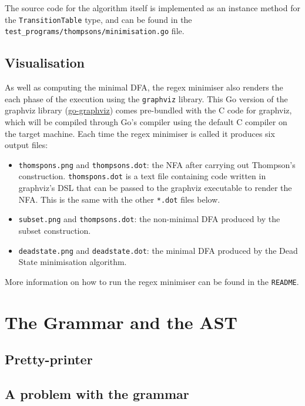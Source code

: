\documentclass[]{full}
\theoremstyle{definition}
\begin{document}
The source code for the algorithm itself is implemented as an instance method for the \verb|TransitionTable| type, and can be found in the \verb|test_programs/thompsons/minimisation.go| file.

\subsection{Visualisation}

As well as computing the minimal DFA, the regex minimiser also renders the each phase of the execution using the \verb|graphviz| library. This Go version of the graphviz library (\href{https://github.com/goccy/go-graphviz}{go-graphviz}) comes pre-bundled with the C code for graphviz, which will be compiled through Go's compiler using the default C compiler on the target machine. Each time the regex minimiser is called it produces six output files:

\begin{itemize}
    \item \verb|thomspons.png| and \verb|thompsons.dot|: the NFA after carrying out Thompson's construction. \verb|thomspons.dot| is a text file containing code written in graphviz's DSL that can be passed to the graphviz executable to render the NFA. This is the same with the other \verb|*.dot| files below.
    \item \verb|subset.png| and \verb|thompsons.dot|: the non-minimal DFA produced by the subset construction.
    \item \verb|deadstate.png| and \verb|deadstate.dot|: the minimal DFA produced by the Dead State minimisation algorithm.
\end{itemize}

More information on how to run the regex minimiser can be found in the \verb|README|.

\section{The Grammar and the AST}

\subsection{Pretty-printer}

\subsection{A problem with the grammar}
\end{document}
